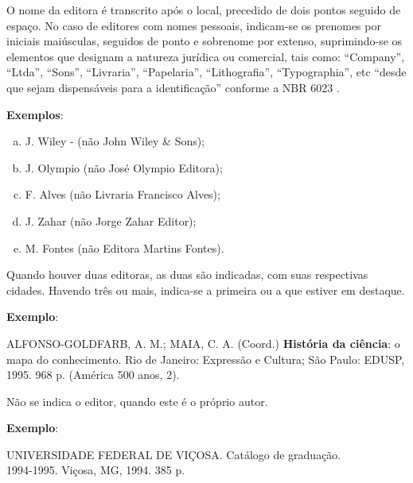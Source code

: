 O nome da editora é transcrito após o local, precedido de dois pontos seguido de espaço. No caso de editores com nomes pessoais, indicam-se os prenomes por iniciais maiúsculas, seguidos de ponto e sobrenome por extenso, suprimindo-se os elementos que designam a natureza jurídica ou comercial, tais como: ``Company'', ``Ltda'', ``Sons'', ``Livraria'', ``Papelaria'', ``Lithografia'', ``Typographia'', etc ``desde que sejam dispensáveis para a identificação'' conforme a NBR 6023 \cite{NBR6023:2002}.

\begin{exemplomanual}
\textbf{Exemplos}:

\begin{enumerate}[a)]
  \item  J. Wiley - (não John Wiley \& Sons);
  \item  J. Olympio (não José Olympio Editora);
  \item  F. Alves (não Livraria Francisco Alves);
  \item  J. Zahar (não Jorge Zahar Editor);
  \item  M. Fontes (não Editora Martins Fontes).
\end{enumerate}
\end{exemplomanual}

Quando houver duas editoras, as duas são indicadas, com suas respectivas cidades. Havendo três ou mais, indica-se a primeira ou a que estiver em destaque.

\begin{exemplomanual}
\textbf{Exemplo}:\\
\begin{singlespace}
ALFONSO-GOLDFARB, A. M.; MAIA, C. A. (Coord.) \textbf{História da ciência}: o mapa do conhecimento. Rio de Janeiro: Expressão e Cultura; São Paulo: EDUSP, 1995. 968 p. (América 500 anos, 2).
\end{singlespace}
\end{exemplomanual}

Não se indica o editor, quando este é o próprio autor.

\begin{exemplomanual}
\textbf{Exemplo}:\\
\begin{singlespace}
UNIVERSIDADE FEDERAL DE VIÇOSA. Catálogo de graduação.\\
1994-1995. Viçosa, MG, 1994. 385 p.
\end{singlespace}
\end{exemplomanual}

